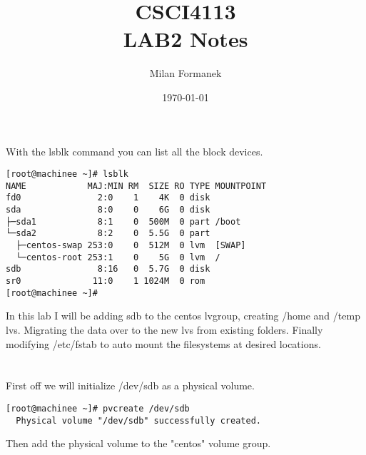 \documentclass[11pt,onside]{article}
\title{\blue CSCI4113 \\
\blueb LAB2 Notes}
\author{Milan Formanek}
\date{\today} %
\begin{document}
\maketitle

\section{}
With the lsblk command you can list all the block devices.  
\begin{lstlisting}
[root@machinee ~]# lsblk
NAME            MAJ:MIN RM  SIZE RO TYPE MOUNTPOINT
fd0               2:0    1    4K  0 disk
sda               8:0    0    6G  0 disk
├─sda1            8:1    0  500M  0 part /boot
└─sda2            8:2    0  5.5G  0 part
  ├─centos-swap 253:0    0  512M  0 lvm  [SWAP]
  └─centos-root 253:1    0    5G  0 lvm  /
sdb               8:16   0  5.7G  0 disk
sr0              11:0    1 1024M  0 rom
[root@machinee ~]#
\end{lstlisting}
In this lab I will be adding sdb to the centos lvgroup, creating /home and /temp lvs. Migrating the data over to the new lvs from existing folders. Finally modifying /etc/fstab to auto mount the filesystems at desired locations.
\section{}

First off we will initialize /dev/sdb as a physical volume. 

\begin{lstlisting}
[root@machinee ~]# pvcreate /dev/sdb
  Physical volume "/dev/sdb" successfully created.
\end{lstlisting}

Then add the physical volume to the "centos" volume group.
\end{document}
